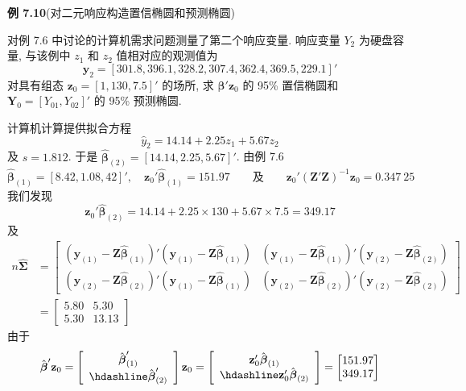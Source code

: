 
\noindent\textbf{例 7.10}\quad (对二元响应构造置信椭圆和预测椭圆)

对例 7.6 中讨论的计算机需求问题测量了第二个响应变量. 响应变量 $Y_2$ 为硬盘容量, 与该例中 $z_1$ 和 $z_2$ 值相对应的观测值为
\[
\mathbf{y}_2=[301.8,396.1,328.2,307.4,362.4,369.5,229.1]'
\]
对具有组态 $\mathbf{z}_0=[1,130,7.5]'$ 的场所, 求 $\boldsymbol{\beta}'\mathbf{z}_0$ 的 95\% 置信椭圆和 $\mathbf{Y}_0=[Y_{01},Y_{02}]'$ 的 95\% 预测椭圆.

计算机计算提供拟合方程
\[
\hat{y}_2=14.14+2.25z_1+5.67z_2
\]
及 $s=1.812$. 于是 $\hat{\boldsymbol{\beta}}_{(2)}=[14.14,2.25,5.67]'$. 由例 7.6
\[
\hat{\boldsymbol{\beta}}_{(1)}=[8.42,1.08,42]',\quad
\mathbf{z}_0'\hat{\boldsymbol{\beta}}_{(1)}=151.97\qquad\text{及}\qquad
\mathbf{z}_0'(\mathbf{Z}'\mathbf{Z})^{-1}\mathbf{z}_0=0.347\ 25
\]
我们发现
\[
\mathbf{z}_0'\hat{\boldsymbol{\beta}}_{(2)}=14.14+2.25\times130+5.67\times7.5=349.17
\]
及
\[
\begin{aligned}
n\hat{\boldsymbol{\Sigma}}&=
\begin{bmatrix}
(\mathbf{y}_{(1)}-\mathbf{Z}\hat{\boldsymbol{\beta}}_{(1)})'(\mathbf{y}_{(1)}-\mathbf{Z}\hat{\boldsymbol{\beta}}_{(1)})&
(\mathbf{y}_{(1)}-\mathbf{Z}\hat{\boldsymbol{\beta}}_{(1)})'(\mathbf{y}_{(2)}-\mathbf{Z}\hat{\boldsymbol{\beta}}_{(2)})\\[4pt]
(\mathbf{y}_{(2)}-\mathbf{Z}\hat{\boldsymbol{\beta}}_{(2)})'(\mathbf{y}_{(1)}-\mathbf{Z}\hat{\boldsymbol{\beta}}_{(1)})&
(\mathbf{y}_{(2)}-\mathbf{Z}\hat{\boldsymbol{\beta}}_{(2)})'(\mathbf{y}_{(2)}-\mathbf{Z}\hat{\boldsymbol{\beta}}_{(2)})
\end{bmatrix}\\
&=\begin{bmatrix}5.80&5.30\\5.30&13.13\end{bmatrix}
\end{aligned}
\]
由于
\[
\hat{\boldsymbol{\beta}}'\mathbf{z}_0=
\left[\begin{array}{c}\hat{\boldsymbol{\beta}}_{(1)}'\\ \hdashline \hat{\boldsymbol{\beta}}_{(2)}'\end{array}\right]\mathbf{z}_0
=\left[\begin{array}{c}\mathbf{z}_0'\hat{\boldsymbol{\beta}}_{(1)}\\ \hdashline \mathbf{z}_0'\hat{\boldsymbol{\beta}}_{(2)}\end{array}\right]
=\begin{bmatrix}151.97\\349.17\end{bmatrix}
\]
